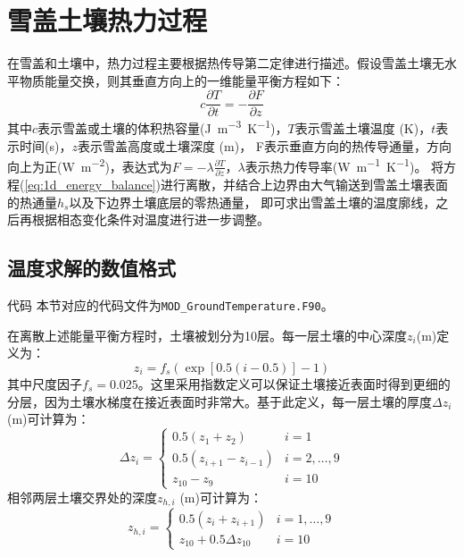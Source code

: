 \chapter{雪盖土壤热力过程}


在雪盖和土壤中，热力过程主要根据热传导第二定律进行描述。假设雪盖土壤无水平物质能量交换，则其垂直方向上的一维能量平衡方程如下：
\begin{equation}\label{eq:1d_energy_balance}
c \frac{\partial T}{\partial t}=-\frac{\partial F}{\partial z}
\end{equation}
其中$c$表示雪盖或土壤的体积热容量(\unit{J.m^{-3}.K^{-1}})，$T$表示雪盖土壤温度 (K)，$t$表示时间(s)，$z$表示雪盖高度或土壤深度 (m)，
F表示垂直方向的热传导通量，方向向上为正(\unit{W.m^{-2}})，表达式为$F=-\lambda\frac{\partial T}{\partial z}$，$\lambda$表示热力传导率(\unit{W.m^{-1}.K^{-1}})。
将方程(\ref{eq:1d_energy_balance})进行离散，并结合上边界由大气输送到雪盖土壤表面的热通量$h_s$以及下边界土壤底层的零热通量，
即可求出雪盖土壤的温度廓线，之后再根据相态变化条件对温度进行进一步调整。


\section{温度求解的数值格式}\label{温度求解的数值格式}

\begin{mymdframed}{代码}
本节对应的代码文件为\texttt{MOD\_GroundTemperature.F90}。
\end{mymdframed}

在离散上述能量平衡方程时，土壤被划分为10层。每一层土壤的中心深度$z_i$(m)定义为：
\begin{equation}
z_{i} = f_{s}\left( \exp{\left\lbrack 0.5(i - 0.5) \right\rbrack - 1} \right)
\end{equation}
%
其中尺度因子$f_s=0.025$。这里采用指数定义可以保证土壤接近表面时得到更细的分层，因为土壤水梯度在接近表面时非常大。基于此定义，每一层土壤的厚度$\Delta z_i$ (m)可计算为：
\begin{equation}
\Delta z_{i}=\left\{\begin{array}{ll}0.5\left(z_{1}+z_{2}\right) & i=1 \\
0.5\left(z_{i+1}-z_{i-1}\right) & i=2, \ldots, 9 \\ 
z_{10}-z_{9} & i=10\end{array}\right.
\end{equation}
相邻两层土壤交界处的深度$z_{h,i}$ (m)可计算为：
\begin{equation}
z_{h, i}=\left\{\begin{array}{ll}0.5\left(z_{i}+z_{i+1}\right) & i=1, \ldots, 9 \\
z_{10}+0.5 \Delta z_{10} & i=10\end{array}\right.
\end{equation}



